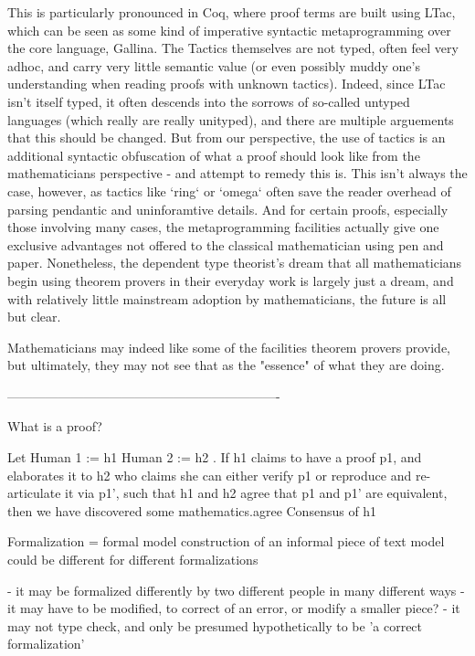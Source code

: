 This is particularly pronounced in Coq, where proof terms are built using LTac,
which can be seen as some kind of imperative syntactic metaprogramming over the
core language, Gallina. The Tactics themselves are not typed, often feel very
adhoc, and carry very little semantic value (or even possibly muddy one's
understanding when reading proofs with unknown tactics). Indeed, since LTac
isn't itself typed, it often descends into the sorrows of so-called untyped
languages (which really are really unityped), and there are multiple arguements
that this should be changed. But from our perspective, the use of tactics is an
additional syntactic obfuscation of what a proof should look like from the
mathematicians perspective - and attempt to remedy this is. This isn't always
the case, however, as tactics like `ring` or `omega` often save the reader
overhead of parsing pendantic and uninforamtive details. And for certain proofs,
especially those involving many cases, the metaprogramming facilities actually
give one exclusive advantages not offered to the classical mathematician using
pen and paper. Nonetheless, the dependent type theorist's dream that all
mathematicians begin using theorem provers in their everyday work is largely
just a dream, and with relatively little mainstream adoption by mathematicians,
the future is all but clear.

Mathematicians may indeed like some of the facilities theorem provers provide,
but ultimately, they may not see that as the "essence" of what they are doing.

----------------------------------------------------------------

What is a proof? 

Let
Human 1 := h1
Human 2 := h2
. If h1 claims to have a proof p1, and elaborates it to h2 who claims she can
either verify p1 or 
reproduce and re-articulate it via p1', such that h1 and h2 agree that p1 and
p1' are equivalent, then we have discovered some mathematics.agree Consensus of h1


  Formalization = formal model construction of an informal piece of text
  model could be different for different formalizations

  - it may be formalized differently by two different people in many different ways
  - it may have to be modified, to correct of an error, or modify a smaller piece?
  - it may not type check, and only be presumed hypothetically to be 'a correct formalization'


